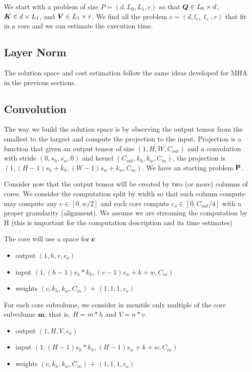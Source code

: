 \documentclass[journal]{IEEEtran}
\begin{document}
We start with a problem of size $P=(d,L_0,L_1,r)$ so that ${\boldsymbol Q} \in
L_0\times d$, ${\boldsymbol K} \in d\times L_1$, and ${\boldsymbol V} \in L_1\times
r$. We find all the problem $c=(d,l_c,\ell_c,r)$ that fit in a core
and we can estimate the execution time.

\subsection{Layer Norm}
The solution space and cost estimation follow the same ideas developed
for MHA in the previous sections.

\subsection{Convolution}
The way we build the solution space is by observing the output tensor
from the smallest to the largest and compute the projection to the
input. Projection is a function that given an output tensor of size
$(1,H,W,C_{out})$ and a convolution with stride $(0, s_h, s_w,0)$ and
kernel $(C_{out}, k_h, k_w,C_{in})$, the projection is $(1,
(H-1)s_h+k_h, (W-1)s_w+k_w,C_{in})$. We have an starting problem ${\bf
  P}$.

Consider now that the output tensor will be created by two (or more)
columns of cores. We consider the computation split by width so that
each column compute may compute any $v \in [0,w/2]$ and each core
compute $c_o \in [0,C_{out}/4]$ with a proper granularity
(alignment). We assume we are streaming the computation by H (this is
important for the computation description and its time estimates)

The core will use a space for ${\bf c}$
\begin{itemize}
  \item output $(1,h,v,c_o)$ 
  \item input  $(1,(h-1)s_h*k_h,(v-1)s_w+k+w,C_{in})$ 
  \item weights $(c,k_h,k_w,C_{in})$ + $(1,1,1,c_o)$ 
\end{itemize}

For each core subvolume, we consider in memtile only multiple of the
core subvolume ${\bf m}$; that is, $H = m*h$ and $V=n*v$.
\begin{itemize}
  \item output $(1,H,V,c_o)$ 
  \item input  $(1,(H-1)s_h*k_h,(H-1)s_w+k+w,C_{in})$ 
  \item weights $(c,k_h,k_w,C_{in})$ + $(1,1,1,c_o)$ 
\end{itemize}
\end{document}
